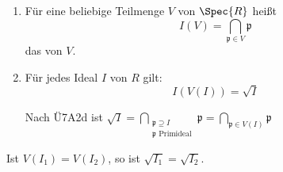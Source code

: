 \begin{DefBem}

\begin{enumerate}
\item F\"ur eine beliebige Teilmenge $V$ von $\Spec{R}$ hei\ss t $$\displaystyle I(V) = \bigcap_{\mathfrak{p} \in V} \mathfrak{p}$$ das  von $V$.

\item F\"ur jedes Ideal $I$ von $R$ gilt:
$$I(V(I)) = \sqrt{I}$$

\begin{Bew}
Nach \"U7A2d ist $\displaystyle \sqrt{I} = \bigcap_{\substack{\mathfrak{p} \supseteq I \\ \mathfrak{p} \text{ Primideal}}} \mathfrak{p} = \bigcap_{\mathfrak{p} \in V(I)} \mathfrak{p}$
\end{Bew}

\end{enumerate}

\end{DefBem}

\begin{nnFolg}
Ist $V(I_1) = V(I_2)$, so ist $\sqrt{I_1} = \sqrt{I_2}$.
\end{nnFolg}

